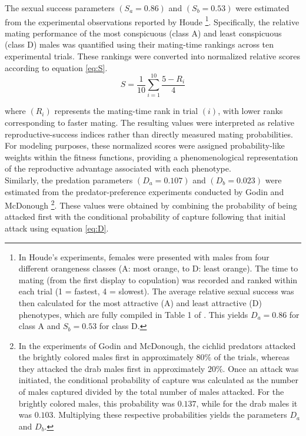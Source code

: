 The sexual success parameters \((S_a=0.86)\) and \((S_b=0.53)\) were estimated from the experimental observations reported by Houde \cite{houdeMATECHOICEBASED1987}\footnote{In Houde's experiments, females were presented with males from four different orangeness classes (A: most orange, to D: least orange). The time to mating (from the first display to copulation) was recorded and ranked within each trial (1 = fastest, 4 = slowest). The average relative sexual success was then calculated for the most attractive (A) and least attractive (D) phenotypes, which are fully compiled in Table 1 of \cite{houdeMATECHOICEBASED1987}. This yields \(D_a = 0.86\) for class A and \(S_b = 0.53\) for class D.}. Specifically, the relative mating performance of the most conspicuous (class A) and least conspicuous (class D) males was quantified using their mating-time rankings across ten experimental trials. These rankings were converted into normalized relative scores according to equation \ref{eq:S}. \\ 

\begin{equation}
    S=\frac{1}{10}\sum_{i=1}^{10}\frac{5-R_i}{4}
    \label{eq:S}
\end{equation}


where \((R_i)\) represents the mating-time rank in trial \((i)\), with lower ranks corresponding to faster mating. The resulting values were interpreted as relative reproductive-success indices rather than directly measured mating probabilities. For modeling purposes, these normalized scores were assigned probability-like weights within the fitness functions, providing a phenomenological representation of the reproductive advantage associated with each phenotype.\\ 

Similarly, the predation parameters \((D_a=0.107)\) and \((D_b=0.023)\) were estimated from the predator-preference experiments conducted by Godin and McDonough \cite{godinPredatorPreferenceBrightly2003}  \footnote{In the experiments of Godin and McDonough, the cichlid predators attacked the brightly colored males first in approximately \(80\%\) of the trials, whereas they attacked the drab males first in approximately \(20\%\). Once an attack was initiated, the conditional probability of capture was calculated as the number of males captured divided by the total number of males attacked. For the brightly colored males, this probability was \(0.137\), while for the drab males it was \(0.103\). Multiplying these respective probabilities yields the parameters \(D_a\) and \(D_b\).}. These values were obtained by combining the probability of being attacked first with the conditional probability of capture following that initial attack using equation \ref{eq:D}. \\ 


